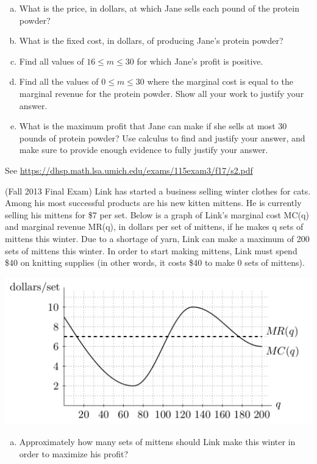 \documentclass[11pt]{exam}
\begin{document}
\begin{questions}
	\begin{enumerate}[(a)]
		\item What is the price, in dollars, at which Jane sells each pound of the protein powder?
		\item What is the fixed cost, in dollars, of producing Jane's protein powder?
		\item Find all values of $16 \leqslant m \leqslant 30$ for which Jane's profit is positive.
		\item Find all the values of $0 \leqslant m \leqslant 30$ where the marginal cost is equal to the marginal revenue for the protein powder. Show all your work to justify your answer.
		\item What is the maximum profit that Jane can make if she sells at most 30 pounds of protein powder? Use calculus to find and justify your answer, and make sure to provide enough evidence to fully justify your answer.
		\end{enumerate}
                \begin{solution}
                  See \href{https://dhsp.math.lsa.umich.edu/exams/115exam3/f17/s2.pdf}{https://dhsp.math.lsa.umich.edu/exams/115exam3/f17/s2.pdf}
                \end{solution}
\question (Fall 2013 Final Exam) %
Link has started a business selling winter clothes for cats. Among his most successful products are his new kitten mittens. He is currently selling his mittens for \$7 per set. Below is a graph of Link's marginal cost MC(q) and marginal revenue MR(q), in dollars per set of mittens, if he makes q sets of mittens this winter. Due to a shortage of yarn, Link can make a maximum of 200 sets of mittens this winter. In order to start making mittens, Link must spend \$40 on knitting supplies (in other words, it costs \$40 to make 0 sets of mittens).	
\begin{center}
  \includegraphics[scale=0.5]{link}
\end{center}
\begin{enumerate}[(a)]
	\item Approximately how many sets of mittens should Link make this winter in order to maximize his profit?
	

\end{enumerate}
\end{questions}
\end{document}
